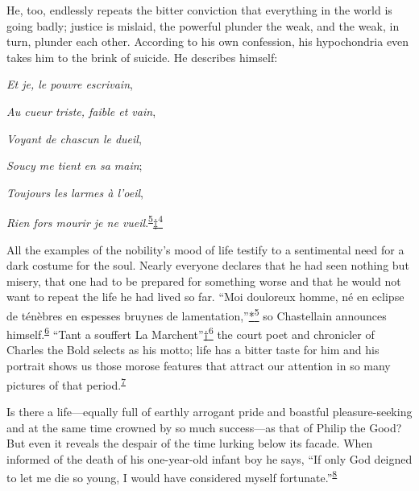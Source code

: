 He, too, endlessly repeats the bitter conviction that everything in the
world is going badly; justice is mislaid, the powerful plunder the weak,
and the weak, in turn, plunder each other. According to his own
confession, his hypochondria even takes him to the brink of suicide. He
describes himself:

\emph{Et je, le pouvre escrivain},

\emph{Au cueur triste, faible et vain},

\emph{Voyant de chascun le dueil},

\emph{Soucy me tient en sa main};

\emph{Toujours les larmes à l'oeil},

\emph{Rien fors mourir je ne
vueil}.\textsuperscript{\protect\hypertarget{09_Chapter_Two__THE_CRAVING_FOR_A_M.xhtmlux5cux23id_2076}{\protect\hyperlink{23_NOTES.xhtmlux5cux23id_2077}{5}}}\protect\hypertarget{09_Chapter_Two__THE_CRAVING_FOR_A_M.xhtmlux5cux23id_2417}{\protect\hyperlink{23_NOTES.xhtmlux5cux23id_2418}{‡\textsuperscript{4}}}

All the examples of the nobility's mood of life testify to a
senti\protect\hypertarget{09_Chapter_Two__THE_CRAVING_FOR_A_M.xhtmlux5cux23page_34}{}{}mental
need for a dark costume for the soul. Nearly everyone declares that he
had seen nothing but misery, that one had to be prepared for something
worse and that he would not want to repeat the life he had lived so far.
``Moi douloreux homme, né en eclipse de ténèbres en espesses bruynes de
lamentation,''\protect\hypertarget{09_Chapter_Two__THE_CRAVING_FOR_A_M.xhtmlux5cux23id_2419}{\protect\hyperlink{23_NOTES.xhtmlux5cux23id_2420}{*\textsuperscript{5}}}
so Chastellain announces
himself.\textsuperscript{\protect\hypertarget{09_Chapter_Two__THE_CRAVING_FOR_A_M.xhtmlux5cux23id_2074}{\protect\hyperlink{23_NOTES.xhtmlux5cux23id_2075}{6}}}
``Tant a souffert La
Marchent''\protect\hypertarget{09_Chapter_Two__THE_CRAVING_FOR_A_M.xhtmlux5cux23id_2421}{\protect\hyperlink{23_NOTES.xhtmlux5cux23id_2422}{†\textsuperscript{6}}}
the court poet and chronicler of Charles the Bold selects as his motto;
life has a bitter taste for him and his portrait shows us those morose
features that attract our attention in so many pictures of that
period.\textsuperscript{\protect\hypertarget{09_Chapter_Two__THE_CRAVING_FOR_A_M.xhtmlux5cux23id_2072}{\protect\hyperlink{23_NOTES.xhtmlux5cux23id_2073}{7}}}

Is there a life---equally full of earthly arrogant pride and boastful
pleasure-seeking and at the same time crowned by so much success---as
that of Philip the Good? But even it reveals the despair of the time
lurking below its facade. When informed of the death of his one-year-old
infant boy he says, ``If only God deigned to let me die so young, I
would have considered myself
fortunate.''\textsuperscript{\protect\hypertarget{09_Chapter_Two__THE_CRAVING_FOR_A_M.xhtmlux5cux23id_2070}{\protect\hyperlink{23_NOTES.xhtmlux5cux23id_2071}{8}}}

